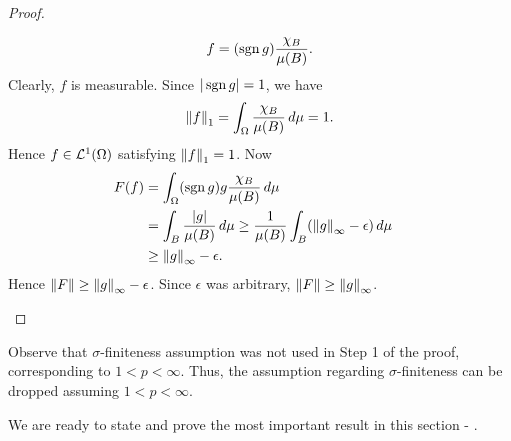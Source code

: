 \begin{proof}
\begin{step}
\begin{align*}
    f = (\operatorname*{sgn} g) \frac{\chi_B}{\mu(B)}.
\end{align*}
Clearly, $f$ is measurable. Since $|\operatorname*{sgn} g| = 1$, we have
\begin{align*}
    \left\lVert f\right\rVert_1 = \int_\Omega \frac{\chi_B}{\mu(B)} \,d\mu = 1.
\end{align*}
Hence $f \in {\mathcal {L}^1}(\Omega)$ satisfying $\left\lVert f\right\rVert_1 = 1$. Now
\begin{align*}
    F(f) &= \int_\Omega (\operatorname*{sgn} g) g \frac{\chi_B}{\mu(B)}  \,d\mu & \\
         &= \int_B \frac{|g|}{\mu(B)} \,d\mu \geq \frac{1}{\mu(B)} \int_B (\left\lVert g\right\rVert_\infty - \epsilon) \,d\mu & \\
         &\geq \left\lVert g\right\rVert_\infty - \epsilon.
\end{align*}
Hence $\left\lVert F\right\rVert \geq \left\lVert g\right\rVert_\infty - \epsilon$. Since $\epsilon$ was arbitrary, $\left\lVert F\right\rVert \geq \left\lVert g\right\rVert_\infty$.
\end{step}
\end{proof}
\begin{remark}
Observe that $\sigma$-finiteness assumption was not used in Step 1 of the proof, corresponding to $1 < p < \infty$. Thus, the assumption regarding $\sigma$-finiteness can be dropped assuming $1 < p < \infty$.
\end{remark}
We are ready to state and prove the most important result in this section - .

